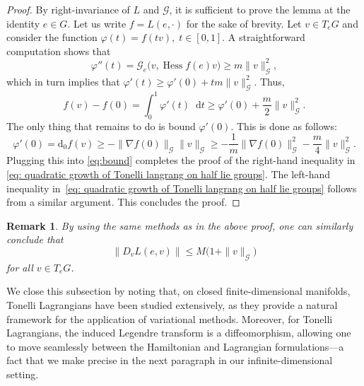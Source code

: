 \documentclass[11pt,reqno]{amsart}
\theoremstyle{plain}
\newtheorem{rem}[thm]{Remark}
\theoremstyle{definition}
\theoremstyle{plain} %
\newtheorem{rem}[rem]{Remark}
\theoremstyle{definition} %
\numberwithin{equation}{section}
\def\d{\delta}
\def\d{\delta}
\def\d{{\mathrm{d}}}
\begin{document}
\begin{proof}
    By right-invariance of \( L \) and \( \mathcal{G} \), it is sufficient to prove the lemma at the identity \( e \in G \). Let us write \( f = L(e, \cdot) \) for the sake of brevity. Let \( v \in T_e G \) and consider the function \( \varphi(t) = f(tv), \; t \in [0, 1] \). A straightforward computation shows that
    \begin{equation*}
        \varphi''(t) = \mathcal{G}_e \big(v, \operatorname{Hess}f (e) v \big) \geq m \| v \|^2_\mathcal{G},
    \end{equation*}
    which in turn implies that \( \varphi'(t) \geq \varphi'(0) + t m \| v \|^2_\mathcal{G} \).
    Thus,
    \begin{equation}\label{eq:bound}
        f(v) - f(0) = \int_0^1 \varphi'(t) \mathop{}\!\mathrm{d}t
        \geq \varphi'(0) + \frac{m}{2} \| v \|^2_\mathcal{G}.
    \end{equation}
    The only thing that remains to do is bound \( \varphi'(0) \). This is done as follows:
    \begin{equation*}
       \varphi'(0) = \d_0 f(v) 
            \geq - \| \nabla f(0) \|_\mathcal{G} \| v \|_\mathcal{G} 
            \geq - \frac{1}{m} \| \nabla f(0) \|_\mathcal{G}^2 - \frac{m}{4} \| v \|_\mathcal{G}^2.
    \end{equation*}
    Plugging this into \eqref{eq:bound} completes the proof of the right-hand inequality in \eqref{eq: quadratic growth of Tonelli langrang on half lie groups}. The left-hand inequality in~\eqref{eq: quadratic growth of Tonelli langrang on half lie groups} follows from a similar argument. This concludes the proof.
\end{proof}

\begin{rem}\label{rem: fibrewise differential grows quadratically}
    By using the same methods as in the above proof, one can similarly conclude that
\begin{equation*}
    \| D_v L (e, v) \| \leq M \bigl(1 + \| v \|_\mathcal{G}\bigr)
\end{equation*}
for all \( v \in T_e G \).
\end{rem}
We close this subsection by noting that, on closed finite-dimensional manifolds, Tonelli Lagrangians have been studied extensively, as they provide a natural framework for the application of variational methods. Moreover, for Tonelli Lagrangians, the induced Legendre transform is a diffeomorphism, allowing one to move seamlessly between the Hamiltonian and Lagrangian formulations—a fact that we make precise in the next paragraph in our infinite-dimensional setting.\medskip
\end{document}
